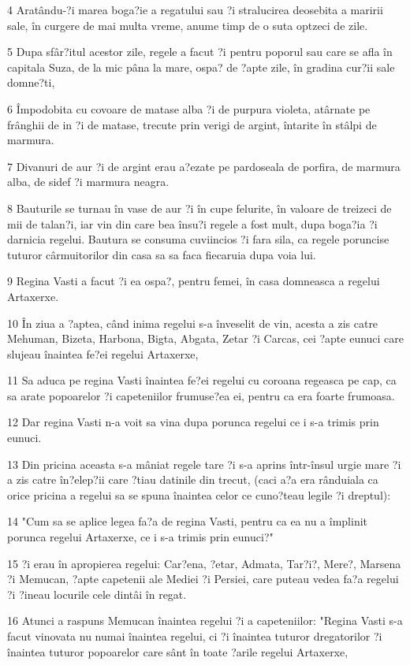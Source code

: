\par 4 Aratându-?i marea boga?ie a regatului sau ?i stralucirea deosebita a maririi sale, în curgere de mai multa vreme, anume timp de o suta optzeci de zile.
\par 5 Dupa sfâr?itul acestor zile, regele a facut ?i pentru poporul sau care se afla în capitala Suza, de la mic pâna la mare, ospa? de ?apte zile, în gradina cur?ii sale domne?ti,
\par 6 Împodobita cu covoare de matase alba ?i de purpura violeta, atârnate pe frânghii de in ?i de matase, trecute prin verigi de argint, întarite în stâlpi de marmura.
\par 7 Divanuri de aur ?i de argint erau a?ezate pe pardoseala de porfira, de marmura alba, de sidef ?i marmura neagra.
\par 8 Bauturile se turnau în vase de aur ?i în cupe felurite, în valoare de treizeci de mii de talan?i, iar vin din care bea însu?i regele a fost mult, dupa boga?ia ?i darnicia regelui. Bautura se consuma cuviincios ?i fara sila, ca regele poruncise tuturor cârmuitorilor din casa sa sa faca fiecaruia dupa voia lui.
\par 9 Regina Vasti a facut ?i ea ospa?, pentru femei, în casa domneasca a regelui Artaxerxe.
\par 10 În ziua a ?aptea, când inima regelui s-a înveselit de vin, acesta a zis catre Mehuman, Bizeta, Harbona, Bigta, Abgata, Zetar ?i Carcas, cei ?apte eunuci care slujeau înaintea fe?ei regelui Artaxerxe,
\par 11 Sa aduca pe regina Vasti înaintea fe?ei regelui cu coroana regeasca pe cap, ca sa arate popoarelor ?i capeteniilor frumuse?ea ei, pentru ca era foarte frumoasa.
\par 12 Dar regina Vasti n-a voit sa vina dupa porunca regelui ce i s-a trimis prin eunuci.
\par 13 Din pricina aceasta s-a mâniat regele tare ?i s-a aprins într-însul urgie mare ?i a zis catre în?elep?ii care ?tiau datinile din trecut, (caci a?a era rânduiala ca orice pricina a regelui sa se spuna înaintea celor ce cuno?teau legile ?i dreptul):
\par 14 "Cum sa se aplice legea fa?a de regina Vasti, pentru ca ea nu a împlinit porunca regelui Artaxerxe, ce i s-a trimis prin eunuci?"
\par 15 ?i erau în apropierea regelui: Car?ena, ?etar, Admata, Tar?i?, Mere?, Marsena ?i Memucan, ?apte capetenii ale Mediei ?i Persiei, care puteau vedea fa?a regelui ?i ?ineau locurile cele dintâi în regat.
\par 16 Atunci a raspuns Memucan înaintea regelui ?i a capeteniilor: "Regina Vasti s-a facut vinovata nu numai înaintea regelui, ci ?i înaintea tuturor dregatorilor ?i înaintea tuturor popoarelor care sânt în toate ?arile regelui Artaxerxe,

